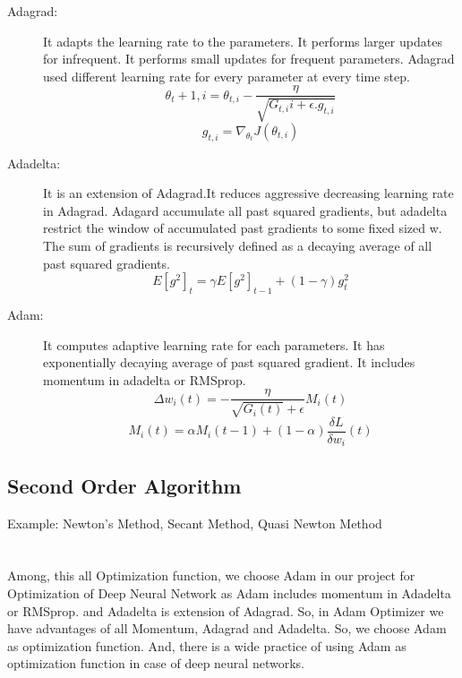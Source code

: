 \begin{description}
                    \item [Adagrad:] It adapts the learning rate to the parameters. It performs larger updates for infrequent. It 
                    performs small updates for frequent parameters. 
                    Adagrad used different learning rate for every parameter at every time step.
                            \begin{equation}
                                \theta_t + 1,i = \theta_{t,i} - \frac{\eta}{\sqrt{G_{t,i}i + \epsilon .g_{t,i}}}
                            \end{equation}
                            \begin{equation}
                                {g_{t,i} = \nabla_{\theta_t}J(\theta_{t,i})}
                            \end{equation}
                    \item [Adadelta:]It is an extension of Adagrad.It reduces aggressive decreasing learning rate in Adagrad. Adagard accumulate all past squared gradients, but adadelta restrict the window of accumulated past gradients to some fixed sized w. The sum of gradients is recursively defined as a decaying average of all past squared gradients.
                    \begin{equation}
                        {E[g^2]_t = \gamma E[g^2]_{t-1} + (1- \gamma)g_t^2}
                    \end{equation} 
                    \item [Adam: ] It computes adaptive learning rate for each parameters. It has exponentially decaying average of past squared gradient. It includes momentum in adadelta or RMSprop. 
                    \begin{equation}
                        {\Delta w_i(t) = - \frac{\eta}{\sqrt{G_i(t)} + \epsilon}M_i(t)}
                    \end{equation}
                    \begin{equation}
                        {M_i(t) = \alpha M_i(t-1) + (1-\alpha)\frac{\delta L}{\delta w_i}(t)}
                    \end{equation}
                \end{description}
            \subsection{Second Order Algorithm}
                Example: Newton's Method, Secant Method, Quasi Newton Method\\\\\\
                Among, this all Optimization function, we choose Adam in our project for Optimization of Deep Neural Network as Adam includes momentum in Adadelta or RMSprop. and Adadelta is extension of Adagrad. So, in Adam Optimizer we have advantages of all Momentum, Adagrad and Adadelta. So, we choose Adam as optimization function. And, there is a wide practice of using Adam as optimization function in case of deep neural networks.
        
